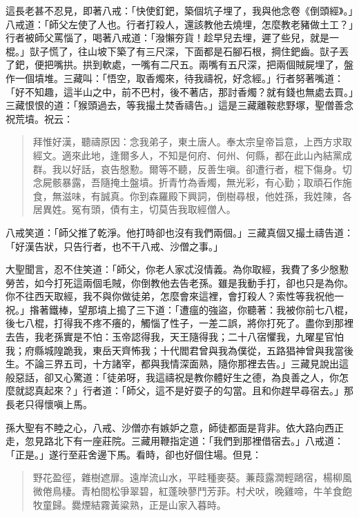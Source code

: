 這長老甚不忍見，即著八戒：「快使釘鈀，築個坑子埋了，我與他念卷《倒頭經》。」八戒道：「師父左使了人也。行者打殺人，還該教他去燒埋，怎麼教老豬做土工？」行者被師父罵惱了，喝著八戒道：「潑懶夯貨！趁早兒去埋，遲了些兒，就是一棍。」獃子慌了，往山坡下築了有三尺深，下面都是石腳石根，掆住鈀齒。獃子丟了鈀，便把嘴拱。拱到軟處，一嘴有二尺五。兩嘴有五尺深，把兩個賊屍埋了，盤作一個墳堆。三藏叫：「悟空，取香燭來，待我禱祝，好念經。」行者努著嘴道：「好不知趣，這半山之中，前不巴村，後不著店，那討香燭？就有錢也無處去買。」三藏恨恨的道：「猴頭過去，等我撮土焚香禱告。」這是三藏離鞍悲野塚，聖僧善念祝荒墳。祝云：
\begin{quote}
拜惟好漢，聽禱原因：念我弟子，東土唐人。奉太宗皇帝旨意，上西方求取經文。適來此地，逢爾多人，不知是何府、何州、何縣，都在此山內結黨成群。我以好話，哀告慇懃。爾等不聽，反善生嗔。卻遭行者，棍下傷身。切念屍骸暴露，吾隨掩土盤墳。折青竹為香燭，無光彩，有心勤；取頑石作施食，無滋味，有誠真。你到森羅殿下興詞，倒樹尋根，他姓孫，我姓陳，各居異姓。冤有頭，債有主，切莫告我取經僧人。
\end{quote}

八戒笑道：「師父推了乾淨。他打時卻也沒有我們兩個。」三藏真個又撮土禱告道：「好漢告狀，只告行者，也不干八戒、沙僧之事。」

大聖聞言，忍不住笑道：「師父，你老人家忒沒情義。為你取經，我費了多少慇懃勞苦，如今打死這兩個毛賊，你倒教他去告老孫。雖是我動手打，卻也只是為你。你不往西天取經，我不與你做徒弟，怎麼會來這裡，會打殺人？索性等我祝他一祝。」揝著鐵棒，望那墳上搗了三下道：「遭瘟的強盜，你聽著：我被你前七八棍，後七八棍，打得我不疼不癢的，觸惱了性子，一差二誤，將你打死了。盡你到那裡去告，我老孫實是不怕：玉帝認得我，天王隨得我；二十八宿懼我，九曜星官怕我；府縣城隍跪我，東岳天齊怖我；十代閻君曾與我為僕從，五路猖神曾與我當後生。不論三界五司，十方諸宰，都與我情深面熟，隨你那裡去告。」三藏見說出這般惡話，卻又心驚道：「徒弟呀，我這禱祝是教你體好生之德，為良善之人，你怎麼就認真起來？」行者道：「師父，這不是好耍子的勾當。且和你趕早尋宿去。」那長老只得懷嗔上馬。

孫大聖有不睦之心，八戒、沙僧亦有嫉妒之意，師徒都面是背非。依大路向西正走，忽見路北下有一座莊院。三藏用鞭指定道：「我們到那裡借宿去。」八戒道：「正是。」遂行至莊舍邊下馬。看時，卻也好個住場。但見：
\begin{quote}
野花盈徑，雜樹遮扉。遠岸流山水，平畦種麥葵。蒹葭露潤輕鷗宿，楊柳風微倦鳥棲。青柏間松爭翠碧，紅蓬映蓼鬥芳菲。村犬吠，晚雞啼，牛羊食飽牧童歸。爨煙結霧黃粱熟，正是山家入暮時。
\end{quote}

